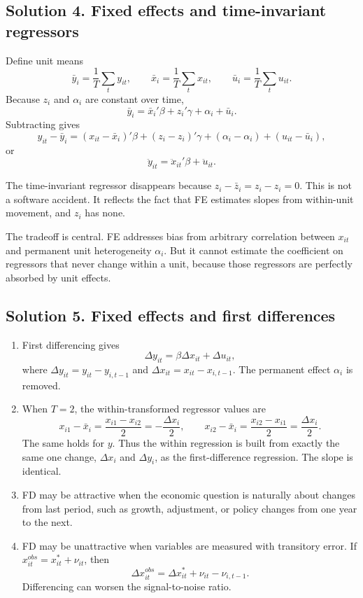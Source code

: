 \documentclass[11pt]{article}
\begin{document}
\subsection*{Solution 4. Fixed effects and time-invariant regressors}

\begin{solutionbox}
Define unit means
\[
\bar{y}_i=\frac{1}{T}\sum_t y_{it},\qquad
\bar{x}_i=\frac{1}{T}\sum_t x_{it},\qquad
\bar{u}_i=\frac{1}{T}\sum_t u_{it}.
\]
Because $z_i$ and $\alpha_i$ are constant over time,
\[
\bar{y}_i=\bar{x}_i'\beta+z_i'\gamma+\alpha_i+\bar{u}_i.
\]
Subtracting gives
\[
y_{it}-\bar{y}_i=(x_{it}-\bar{x}_i)'\beta+(z_i-z_i)'\gamma+(\alpha_i-\alpha_i)+(u_{it}-\bar{u}_i),
\]
or
\[
\ddot{y}_{it}=\ddot{x}_{it}'\beta+\ddot{u}_{it}.
\]

The time-invariant regressor disappears because $z_i-\bar{z}_i=z_i-z_i=0$. This is not a software accident. It reflects the fact that FE estimates slopes from within-unit movement, and $z_i$ has none.

The tradeoff is central. FE addresses bias from arbitrary correlation between $x_{it}$ and permanent unit heterogeneity $\alpha_i$. But it cannot estimate the coefficient on regressors that never change within a unit, because those regressors are perfectly absorbed by unit effects.
\end{solutionbox}

\subsection*{Solution 5. Fixed effects and first differences}

\begin{solutionbox}
\begin{enumerate}[label=(\alph*)]
\item First differencing gives
\[
\Delta y_{it}=\beta \Delta x_{it}+\Delta u_{it},
\]
where $\Delta y_{it}=y_{it}-y_{i,t-1}$ and $\Delta x_{it}=x_{it}-x_{i,t-1}$. The permanent effect $\alpha_i$ is removed.

\item When $T=2$, the within-transformed regressor values are
\[
x_{i1}-\bar{x}_i=\frac{x_{i1}-x_{i2}}{2}=-\frac{\Delta x_i}{2},\qquad
x_{i2}-\bar{x}_i=\frac{x_{i2}-x_{i1}}{2}=\frac{\Delta x_i}{2}.
\]
The same holds for $y$. Thus the within regression is built from exactly the same one change, $\Delta x_i$ and $\Delta y_i$, as the first-difference regression. The slope is identical.

\item FD may be attractive when the economic question is naturally about changes from last period, such as growth, adjustment, or policy changes from one year to the next.

\item FD may be unattractive when variables are measured with transitory error. If $x_{it}^{obs}=x_{it}^*+\nu_{it}$, then
\[
\Delta x_{it}^{obs}=\Delta x_{it}^*+\nu_{it}-\nu_{i,t-1}.
\]
Differencing can worsen the signal-to-noise ratio.
\end{enumerate}
\end{solutionbox}
\end{document}
